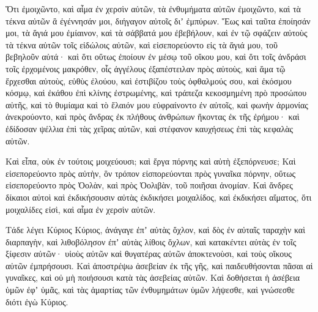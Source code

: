 {Ὅτι ἐμοιχῶντο, καὶ αἷμα ἐν χερσὶν αὐτῶν, τὰ ἐνθυμήματα αὐτῶν ἐμοιχῶντο, καὶ τὰ τέκνα αὐτῶν ἃ ἐγέννησάν μοι, διήγαγον αὐτοῖς διʼ ἐμπύρων.
Ἕως καὶ ταῦτα ἐποίησάν μοι, τὰ ἅγιά μου ἐμίαινον, καὶ τὰ σάββατά μου ἐβεβήλουν,
καὶ ἐν τῷ σφάζειν αὐτοὺς τὰ τέκνα αὐτῶν τοῖς εἰδώλοις αὐτῶν, καὶ εἰσεπορεύοντο εἰς τὰ ἅγιά μου, τοῦ βεβηλοῦν αὐτά· καὶ ὅτι οὕτως ἐποίουν ἐν μέσῳ τοῦ οἴκου μου,
καὶ ὅτι τοῖς ἀνδράσι τοῖς ἐρχομένοις μακρόθεν, οἷς ἀγγέλους ἐξαπέστειλαν πρὸς αὐτοὺς, καὶ ἅμα τῷ ἔρχεσθαι αὐτοὺς, εὐθὺς ἐλούου, καὶ ἐστιβίζου τοὺς ὀφθαλμούς σου, καὶ ἐκόσμου κόσμῳ,
καὶ ἐκάθου ἐπὶ κλίνης ἐστρωμένης, καὶ τράπεζα κεκοσμημένη πρὸ προσώπου αὐτῆς, καὶ τὸ θυμίαμα καὶ τὸ ἔλαιόν μου εὐφραίνοντο ἐν αὐτοῖς,
καὶ φωνὴν ἁρμονίας ἀνεκρούοντο, καὶ πρὸς ἄνδρας ἐκ πλήθους ἀνθρώπων ἥκοντας ἐκ τῆς ἐρήμου· καὶ ἐδίδοσαν ψέλλια ἐπὶ τὰς χεῖρας αὐτῶν, καὶ στέφανον καυχήσεως ἐπὶ τὰς κεφαλὰς αὐτῶν.
\par }{\PP {}Καὶ εἶπα, οὐκ ἐν τούτοις μοιχεύουσι; καὶ ἔργα πόρνης καὶ αὐτὴ ἐξεπόρνευσε;
Καὶ εἰσεπορεύοντο πρὸς αὐτὴν, ὃν τρόπον εἰσπορεύονται πρὸς γυναῖκα πόρνην, οὕτως εἰσεπορεύοντο πρὸς Ὀολὰν, καὶ πρὸς Ὀολιβὰν, τοῦ ποιῆσαι ἀνομίαν.
Καὶ ἄνδρες δίκαιοι αὐτοὶ καὶ ἐκδικήσουσιν αὐτὰς ἐκδικήσει μοιχαλίδος, καὶ ἐκδικήσει αἵματος, ὅτι μοιχαλίδες εἰσὶ, καὶ αἷμα ἐν χερσὶν αὐτῶν.
\par }{\PP {}Τάδε λέγει Κύριος Κύριος, ἀνάγαγε ἐπʼ αὐτὰς ὄχλον, καὶ δὸς ἐν αὐταῖς ταραχὴν καὶ διαρπαγὴν,
καὶ λιθοβόλησον ἐπʼ αὐτὰς λίθοις ὄχλων, καὶ κατακέντει αὐτὰς ἐν τοῖς ξίφεσιν αὐτῶν· υἱοὺς αὐτῶν καὶ θυγατέρας αὐτῶν ἀποκτενοὺσι, καὶ τοὺς οἴκους αὐτῶν ἐμπρήσουσι.
Καὶ ἀποστρέψω ἀσεβείαν ἐκ τῆς γῆς, καὶ παιδευθήσονται πᾶσαι αἱ γυναῖκες, καὶ οὐ μὴ ποιήσουσι κατὰ τὰς ἀσεβείας αὐτῶν.
Καὶ δοθήσεται ἡ ἀσέβεια ὑμῶν ἐφʼ ὑμᾶς, καὶ τὰς ἁμαρτίας τῶν ἐνθυμημάτων ὑμῶν λήψεσθε, καὶ γνώσεσθε διότι ἐγὼ Κύριος.

}
